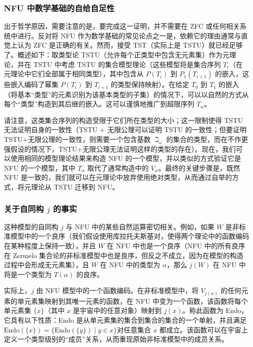 \subsubsection{NFU 中数学基础的自给自足性}
出于哲学原因，需要注意的是，要完成这一证明，并不需要在 ZFC 或任何相关系统中进行。反对将 NFU 作为数学基础的常见论点之一是，依赖它的理由通常与直觉上认为 ZFC 是正确的有关。然而，接受 TST（实际上是 TSTU）就已经足够了。概述如下：取类型论 TSTU（允许每个正类型中包含无元素集）作为元理论，并在 TSTU 中考虑 TSTU 的集合模型理论（这些模型将是集合序列 \(T_i\)（在元理论中它们全部属于相同类型），其中包含从 \(P(T_i)\) 到 \(P_1(T_{i+1})\) 的嵌入，这些嵌入编码了幂集 \(P(T_i)\) 到 \(T_{i+1}\) 的类型保持映射）。在给定 \(T_0\) 到 \(T_1\) 的嵌入（将基本“类型”的元素识别为该基本类型的子集）的情况下，可以以自然的方式从每个“类型”构造到其后继的嵌入。这可以谨慎地推广到超限序列 \(T_\alpha\)。

请注意，这类集合序列的构造受限于它们所在类型的大小；这一限制使得 TSTU 无法证明自身的一致性（TSTU + 无限公理可以证明 TSTU 的一致性；但要证明 TSTU+无限公理的一致性，则需要一个包含基数 \( \beth_{\omega} \) 的集合的类型，而在不作更强假设的情况下，TSTU+无限公理无法证明这样的类型的存在）。现在，我们可以使用相同的模型理论结果来构造 NFU 的一个模型，并以类似的方式验证它是 NFU 的一个模型，其中 \( T_{\alpha} \) 取代了通常构造中的 \( V_{\alpha} \)。最终的关键步骤是，既然 NFU 是一致的，我们就可以在元理论中放弃使用绝对类型，从而通过自举的方式，将元理论从 TSTU 迁移到 NFU。
\subsubsection{关于自同构 \( j \) 的事实}
这种模型的自同构 \( j \) 与 NFU 中的某些自然运算密切相关。例如，如果 \( W \) 是非标准模型中的一个良序（我们假设使用库拉托夫斯基对，使得两个理论中的函数编码在某种程度上保持一致），并且 \( W \) 在 NFU 中也是一个良序（NFU 中的所有良序在 Zermelo 集合论的非标准模型中也是良序，但反之不成立，因为在模型的构造过程中会形成无元素集），且 \( W \) 在 NFU 中的类型为 \( \alpha \)，那么 \( j(W) \) 在 NFU 中将是一个类型为 \( T(\alpha) \) 的良序。  

实际上，\( j \) 由 NFU 模型中的一个函数编码。在非标准模型中，将 \( V_{j(\alpha)} \) 的任何元素的单元素集映射到其唯一元素的函数，在 NFU 中变为一个函数，该函数将每个单元素集 \(\{x\}\)（其中 \( x \) 是宇宙中的任意对象）映射到 \( j(x) \)。称此函数为 Endo，它具有以下性质：Endo 是从单元素集的集合到集合的集合的一个单射，并且满足\(\text{Endo}(\{x\}) = \{\text{Endo}(\{y\}) \mid y \in x\}\)对任意集合 \( x \) 都成立。该函数可以在宇宙上定义一个类型级别的“成员”关系，从而重现原始非标准模型中的成员关系。